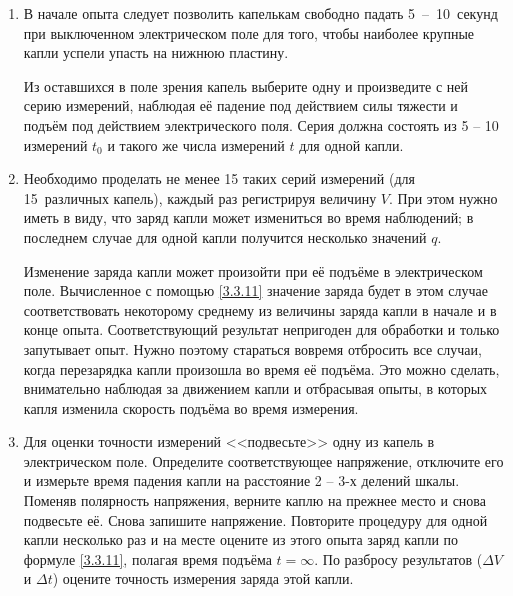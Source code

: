 \begin{lab:task}
\begin{enumerate}
{Для уменьшения ошибок в определении $t_0$ и $t$ нужно для пуска и остановки секундомера использовать один и тот же признак~--- всегда нажимать головку секундомера либо в тот момент, когда капля скрывается за линией шкалы, либо, наоборот, когда она появляется из-за линии. Рекомендуется следить за каплей, не отрываясь от окуляра микроскопа, так как в противном случае легко её потерять из виду и весь эксперимент придётся повторить.}

\item{В начале опыта следует позволить капелькам свободно падать \mbox{5 -- 10}~секунд при выключенном электрическом поле для того, чтобы наиболее крупные капли успели упасть на нижнюю пластину.

Из оставшихся в поле зрения капель выберите одну и произведите с ней серию измерений, наблюдая её падение под действием силы тяжести и подъём под действием электрического поля. Серия должна состоять из 5 -- 10 измерений $t_0$ и такого же числа измерений $t$ для одной капли.}

\item{Необходимо проделать не менее 15 таких серий измерений (для 15~различных капель), каждый раз регистрируя величину $V$. При этом нужно иметь в виду, что заряд капли может измениться во время наблюдений; в последнем случае для одной капли получится несколько значений $q$.

Изменение заряда капли может произойти при её подъёме в электрическом поле. Вычисленное с помощью \eqref{3.3.11} значение заряда будет в этом случае соответствовать некоторому среднему из величины заряда капли в начале и в конце опыта. Соответствующий результат непригоден для обработки и только запутывает опыт. Нужно поэтому стараться вовремя отбросить все случаи, когда перезарядка капли произошла во время её подъёма. Это можно сделать, внимательно наблюдая за движением капли и отбрасывая опыты, в которых капля изменила скорость подъёма во время измерения.}

\item{Для оценки точности измерений <<подвесьте>> одну из капель в электрическом поле. Определите соответствующее напряжение, отключите его  и измерьте время падения капли на расстояние 2 -- 3-х делений шкалы. Поменяв полярность напряжения, верните каплю на прежнее место и снова подвесьте её. Снова запишите напряжение. Повторите  процедуру  для одной капли несколько раз  и на месте оцените из этого опыта заряд капли по формуле \eqref{3.3.11}, полагая время подъёма $t=\infty$. По разбросу результатов ($\Delta V$ и  $\Delta t$) оцените точность измерения заряда этой капли.}


\end{enumerate}
\end{lab:task}
